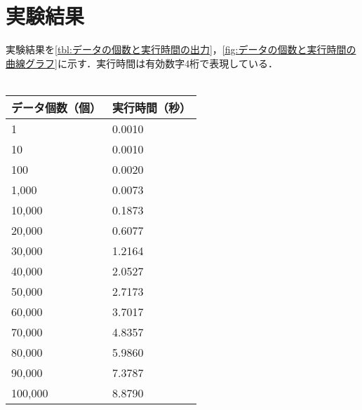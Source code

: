 \section{実験結果}
実験結果を\ref{tbl:データの個数と実行時間の出力}，\ref{fig:データの個数と実行時間の曲線グラフ}に示す．実行時間は有効数字4桁で表現している．\\
\dotfill\\
\begin{minipage}[t]{0.35\textwidth}
    \begin{center}
        \label{tbl:データの個数と実行時間の出力}
        \begin{tabular}{ll}
            \multicolumn{1}{c}{データ個数（個）} & \multicolumn{1}{c}{実行時間（秒）} \\
            \hline
            1                            & 0.0010                      \\
            10                           & 0.0010                      \\
            100                          & 0.0020                      \\
            1,000                        & 0.0073                      \\
            10,000                       & 0.1873                      \\
            20,000                       & 0.6077                      \\
            30,000                       & 1.2164                      \\
            40,000                       & 2.0527                      \\
            50,000                       & 2.7173                      \\
            60,000                       & 3.7017                      \\
            70,000                       & 4.8357                      \\
            80,000                       & 5.9860                      \\
            90,000                       & 7.3787                      \\
            100,000                      & 8.8790                      \\
            \hline
        \end{tabular}
    \end{center}
\end{minipage}
